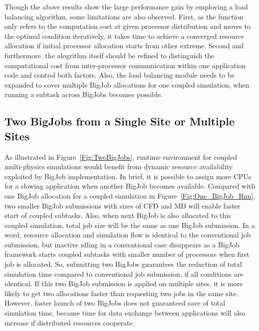 \documentclass[conference,final]{IEEEtran}
\begin{document}
Though the above results show the large performance gain by employing a load balancing algorithm, some limitations are also observed. First, as the function only refers to the computation cost at given processor distribution and moves to the optimal condition iteratively, it takes time to achieve a converged resource allocation if initial processor allocation starts from other extreme. Second and furthermore, the alogrithm itself should be refined to distinguish the computational cost from inter-processor communication within one application code and control both factors. Also, the load balancing module needs to be expanded to cover multiple BigJob allocations for one coupled simulation, when running a subtask across BigJobs becomes possible.


\subsection{Two BigJobs from a Single Site or Multiple Sites}


As illustrated in Figure~\ref{Fig:TwoBigJobs}, runtime environment for coupled multi-physics simulations would benefit from dynamic resource availability exploited by BigJob implementation. In brief, it is possible to assign more CPUs for a slowing application when another BigJob becomes available. Compared with one BigJob allocation for a coupled simulation in Figure~\ref{Fig:One_BigJob_Run}, two smaller BigJob submissions with sizes of CFD and MD will enable faster start of coupled subtasks. Also, when next BigJob is also allocated to this coupled simulation, total job size will be the same as one BigJob submission. In a word, resource allocation and simulation flow is identical to the conventional job submission, but inactive idling in a conventional case disappears as a BigJob framework starts coupled subtasks with smaller number of processors when first job is allocated. So, submitting two BigJobs guarantees the reduction of total simulation time compared to conventional job submission, if all conditions are identical. If this two BigJob submission is applied on multiple sites, it is more likely to get two allocations faster than requesting two jobs in the same site. However, faster launch of two BigJobs does not guaranteed save of total simulation time, because time for data exchange between applications will also increase if distributed resources cooperate.
\end{document}
